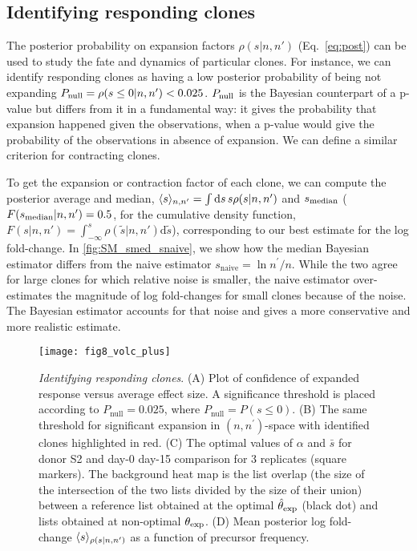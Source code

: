\subsection*{Identifying responding clones}

The posterior probability on expansion factors $\rho(s|n,n')$ (Eq.~\ref{eq:post}) can be used to
study the fate and dynamics of particular clones. For instance, we can
identify responding clones as having a low posterior probability of being not expanding $P_{\rm null}=\rho(s\leq 0|n,n')<0.025$. $P_{\rm null}$ is the Bayesian counterpart of a p-value but differs from it in a fundamental way: it gives the probability that expansion happened given the observations, when a p-value would give the probability of the observations in absence of expansion.  We can define a similar criterion for contracting clones.

To get the expansion or contraction factor of each clone, we can compute the posterior average and median, $\langle s\rangle_{n,n'}=\int \textrm{d}s\,s \rho(s|n,n')$ and $s_{\rm median}$ ($F(s_{\rm median}|n,n')=0.5$, for the cumulative density function, $F(s|n,n')=\int_{-\infty}^s\rho(\tilde{s}|n,n')\textrm{d}\tilde{s}$),  corresponding to our best estimate for the log fold-change.
In \cref{fig:SM_smed_snaive}, we show how the median Bayesian estimator differs from the naive estimator $s_{\textrm{naive}}=\ln n^{\prime}/n$. While the two agree for large clones for which relative noise is smaller, the naive estimator over-estimates the magnitude of log fold-changes for small clones because of the noise. The Bayesian estimator accounts for that noise and gives a more conservative and more realistic estimate.

\begin{figure*}
\texttt{[image: fig8\_volc\_plus]}
\centering{}
\caption{
\emph{Identifying responding clones}. (A) Plot of confidence of expanded response versus average effect size. A significance threshold is placed according to $P_{\textrm{null}}=0.025$, where $P_{\textrm{null}}=P(s\leq 0)$. (B) The same threshold for significant expansion in $(n,n^\prime)$-space with identified clones highlighted in red. (C) The optimal values of $\alpha$ and $\bar{s}$ for donor S2 and day-0 day-15 comparison for 3 replicates (square markers). The background heat map is the list overlap (the size of the intersection of the two lists divided by the size of their union) between a reference list obtained at the optimal $\hat\theta_{\rm exp}$ (black dot) and lists obtained at non-optimal $\theta_{\rm exp}$. (D) Mean posterior log fold-change $\langle s\rangle_{\rho(s|n,n')}$ as a function of precursor frequency.
\label{fig:volcano}}
\end{figure*}

